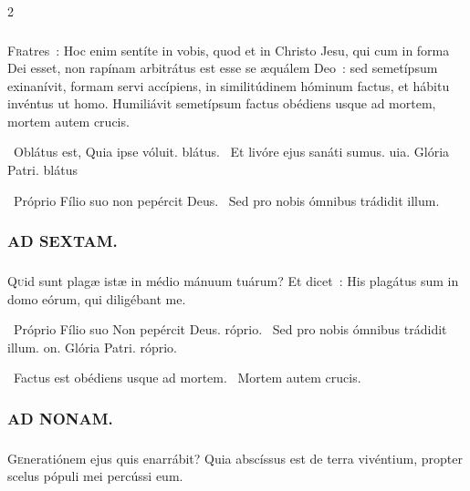 \documentclass[9pt,twoside]{extarticle}
\begin{document}
\begin{multicols}{2}
{{{\subsubsection*{}
\lettrine{F}ratres~: Hoc enim sentíte in vobis, quod et in Christo Jesu, qui cum in forma Dei esset, non rapínam arbitrátus est esse se æquálem Deo~: sed semetípsum exinanívit, formam servi accípiens, in similitúdinem hóminum factus, et hábitu invéntus ut homo. Humiliávit semetípsum factus obédiens usque ad mortem, mortem autem crucis.

\begin{tightlist}{}
\item {}~Oblátus est, \textred{*} Quia ipse vóluit. blátus. ~Et livóre ejus sanáti sumus. uia. Glória Patri. blátus 
\item {}~Próprio Fílio suo non pepércit Deus. ~Sed pro nobis ómnibus trádidit illum.
\end{tightlist}

\subsubsection*{\center \textsc{AD SEXTAM.}}
\subsubsection*{}
\lettrine{Q}uid sunt plagæ istæ in médio mánuum tuárum? Et dicet~: His plagátus sum in domo eórum, qui diligébant me.

\begin{tightlist}{}
\item {}~Próprio Fílio suo \textred{*} Non pepércit Deus. róprio. ~Sed pro nobis ómnibus trádidit illum. on. Glória Patri. róprio.
\item {}~Factus est obédiens usque ad mortem. ~Mortem autem crucis.
\end{tightlist}

\subsubsection*{\center \textsc{AD NONAM.}}
\subsubsection*{}
\lettrine{G}eneratiónem ejus quis enarrábit? Quia abscíssus est de terra vivéntium, propter scelus pópuli mei percússi eum.

}}}
\end{multicols}
\end{document}
